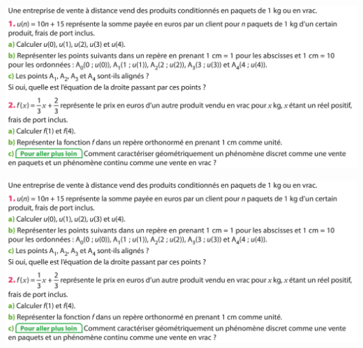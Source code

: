\documentclass{article}
\begin{document}
\begin{center}
\includegraphics[width=\textwidth]{Activite.png}
\end{center}
\vspace*{2cm}
\begin{center}
\includegraphics[width=\textwidth]{Activite.png}
\end{center}
\end{document}
